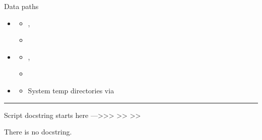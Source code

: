 \documentclass[letterpaper,10pt,english]{sphinxmanual}
\begin{document}
\sphinxAtStartPar
Data paths
\begin{itemize}
\item {} \begin{description}
\begin{itemize}
\item {} 
\sphinxAtStartPar
{},

\item {} 
\sphinxAtStartPar
{}

\end{itemize}

\end{description}

\item {} \begin{description}
\begin{itemize}
\item {} 
\sphinxAtStartPar
{},

\item {} 
\sphinxAtStartPar
{}

\end{itemize}

\end{description}

\item {} \begin{description}
\begin{itemize}
\item {} 
\sphinxAtStartPar
System temp directories via 

\end{itemize}

\end{description}

\end{itemize}


\bigskip\hrule\bigskip


\sphinxAtStartPar
Script docstring starts here —\textgreater{}\textgreater{}\textgreater{}
\textendash{}\textgreater{}\textgreater{}
\textendash{}\textgreater{}\textgreater{}

\sphinxAtStartPar
There is no docstring.
\end{document}
